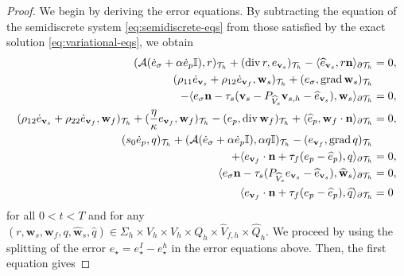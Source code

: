 \documentclass[10pt,letterpaper]{amsart}
\theoremstyle{plain} %
\theoremstyle{remark} %
\newcommand{\vect}[1]{\mathbf{#1}}
\newcommand{\divergence}{\mathrm{div}\,}
\newcommand{\grad}{\mathrm{grad}\,}
\newcommand{\Id}{\mathbb{I}} %
\newcommand{\Ael}{\mathcal{A}} %
\newcommand{\Thprod}[2]{( #1, #2 )_{\mathcal{T}_h}}
\newcommand{\pThprod}[2]{\langle #1, #2 \rangle_{\partial \mathcal{T}_{h}}}
\begin{document}
\begin{proof}
	We begin by deriving the error equations. By subtracting the equation of the semidiscrete system \eqref{eq:semidiscrete-eqs} from those satisfied by the exact solution \eqref{eq:variational-eqs}, we obtain
	\begin{subequations}
		\label{eq:semidiscrete-error-eqs}
		\begin{align}
			\label{eq:semidiscrete-error-eq1}
			\Thprod{\Ael(\dot{e}_{\sigma} + \alpha \dot{e}_{p} \Id)}{r} +\Thprod{\divergence r}{e_{\vect{v}_{s}}} -\pThprod{\widehat{e}_{\vect{v}_{s}}}{r \vect{n}} &= 0 ,
			\\ 
			\label{eq:semidiscrete-error-eq2}
			\Thprod{\rho_{11}\dot{e}_{\vect{v}_{s}} +\rho_{12}\dot{e}_{\vect{v}_{f}}}{\vect{w}_{s}} + \Thprod{e_{\sigma}}{\grad \vect{w}_{s}} &
            \\
            \notag 
            - \pThprod{e_{\sigma} \vect{n}- \tau_{s} (\vect{v}_{s} - {P_{\widehat{V}_s}} \vect{v}_{s,h} - \widehat{e}_{\vect{v}_{s}})}{\vect{w}_{s}} & = 0, 
			\\
			\label{eq:semidiscrete-error-eq3}
			\Thprod{\rho_{12}\dot{e}_{\vect{v}_{s}}+\rho_{22}\dot{e}_{\vect{v}_{f}}}{\vect{w}_{f}} + \Thprod{\frac{\eta}{\kappa} e_{\vect{v}_{f}}}{\vect{w}_{f}} - \Thprod{e_{p} }{\divergence\vect{w}_{f}} +\pThprod{\widehat{e}_{p}}{\vect{w}_{f}\cdot\vect{n}} & = 0, 
			\\
			\label{eq:semidiscrete-error-eq4}
			\Thprod{s_{0}\dot{e}_{p}}{q} + \Thprod{\Ael(\dot{e}_{\sigma}+\alpha \dot{e}_{p}\Id)}{\alpha q\Id} - \Thprod{e_{\vect{v}_{f}}}{\grad q} &
            \\
            \notag 
            + \pThprod{e_{\vect{v}_{f}}\cdot \vect{n} + \tau_f (e_p - \widehat{e}_p)}{q} & = 0,
			\\
			\label{eq:semidiscrete-error-eq5}
			\pThprod{e_{\sigma} \vect{n} - \tau_{s} (P_{\widehat{V}_s} e_{\vect{v}_{s}} - \widehat{e}_{\vect{v}_{s}})}{\widehat{\vect{w}}_{s}} & = 0 ,
			\\
			\label{eq:semidiscrete-error-eq6}
			\pThprod{e_{\vect{v}_f}\cdot \vect{n} + \tau_{f}(e_{p} - \widehat{e}_{p})}{\widehat{q}} & = 0 
		\end{align}
	\end{subequations}
	for all $0<t<T$ and for any $(r, \vect{w}_{s}, \vect{w}_{f}, q, \widehat{\vect{w}}_{s}, \widehat{q}) \in \Sigma_{h} \times V_{h} \times V_{h} \times Q_{h} \times \widehat{V}_{f,h}\times \widehat{Q}_{h}$. We proceed by using the splitting of the error $e_{\star} = e_{\star}^{I} - e_{\star}^{h}$ in the error equations above. Then, the first equation gives

\end{proof}
\end{document}
